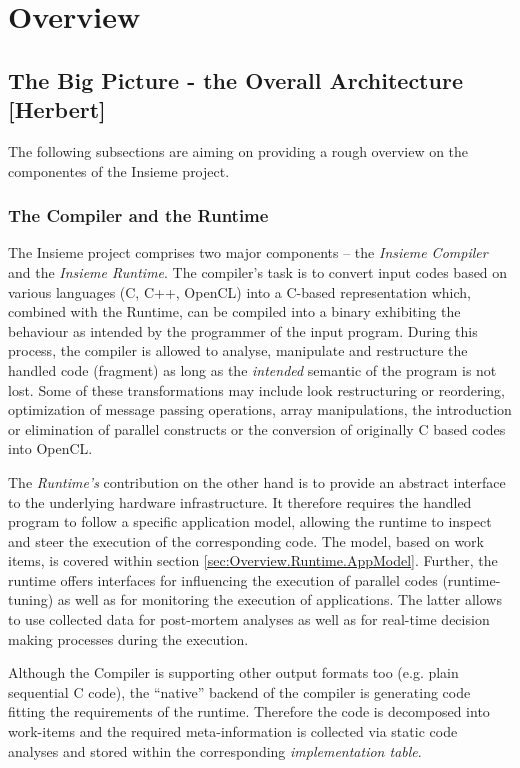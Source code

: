 \chapter{Overview} \label{cap:overview}

\section{The Big Picture - the Overall Architecture [Herbert]}
The following subsections are aiming on providing a rough overview on the
componentes of the Insieme project.

\subsection{The Compiler and the Runtime}
The Insieme project comprises two major components -- the \textit{Insieme
Compiler} and the \textit{Insieme Runtime}. The compiler's task is to convert
input codes based on various languages (C, C++, OpenCL) into a C-based
representation which, combined with the Runtime, can be compiled into a binary
exhibiting the behaviour as intended by the programmer of the input program.
During this process, the compiler is allowed to analyse, manipulate and
restructure the handled code (fragment) as long as the \textit{intended}
semantic of the program is not lost. Some of these transformations may include
look restructuring or reordering, optimization of message passing operations,
array manipulations, the introduction or elimination of parallel constructs or
the conversion of originally C based codes into OpenCL. 

The \textit{Runtime's} contribution on the other hand is to provide an abstract
interface to the underlying hardware infrastructure. It therefore requires the
handled program to follow a specific application model, allowing the runtime to
inspect and steer the execution of the corresponding code. The model, based on
work items, is covered within section \ref{sec:Overview.Runtime.AppModel}.
Further, the runtime offers interfaces for influencing the execution of parallel
codes (runtime-tuning) as well as for monitoring the execution of applications.
The latter allows to use collected data for post-mortem analyses as well as for
real-time decision making processes during the execution.

Although the Compiler is supporting other output formats too (e.g. plain
sequential C code), the ``native'' backend of the compiler is generating code
fitting the requirements of the runtime. Therefore the code is decomposed
into work-items and the required meta-information is collected via static code
analyses and stored within the corresponding \textit{implementation table}.

